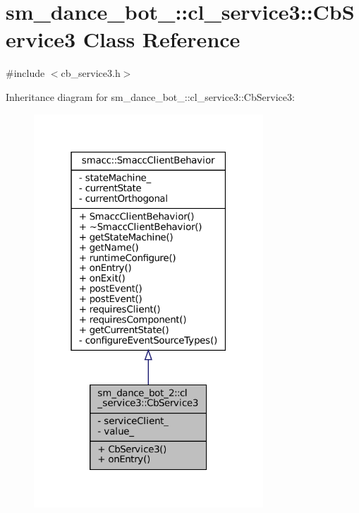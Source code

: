 \hypertarget{classsm__dance__bot__2_1_1cl__service3_1_1CbService3}{}\section{sm\+\_\+dance\+\_\+bot\+\_\+:\+:cl\+\_\+service3\+:\+:Cb\+Service3 Class Reference}
\label{classsm__dance__bot__2_1_1cl__service3_1_1CbService3}


{\ttfamily \#include $<$cb\+\_\+service3.\+h$>$}



Inheritance diagram for sm\+\_\+dance\+\_\+bot\+\_\+:\+:cl\+\_\+service3\+:\+:Cb\+Service3\+:
\nopagebreak
\begin{figure}[H]
\begin{center}
\leavevmode
\includegraphics[width=244pt]{classsm__dance__bot__2_1_1cl__service3_1_1CbService3__inherit__graph}
\end{center}
\end{figure}


